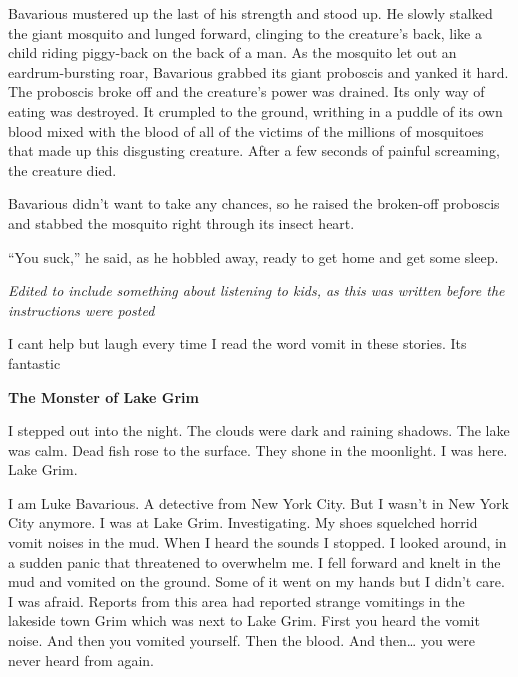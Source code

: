 Bavarious mustered up the last of his strength and stood up. He
slowly stalked the giant mosquito and lunged forward, clinging to
the creature's back, like a child riding piggy-back on the
back of a man. As the mosquito let out an eardrum-bursting roar,
Bavarious grabbed its giant proboscis and yanked it hard. The
proboscis broke off and the creature's power was drained. Its
only way of eating was destroyed. It crumpled to the ground,
writhing in a puddle of its own blood mixed with the blood of all
of the victims of the millions of mosquitoes that made up this
disgusting creature. After a few seconds of painful screaming, the
creature died.



Bavarious didn't want to take any chances, so he raised the
broken-off proboscis and stabbed the mosquito right through its
insect heart.



``You suck,'' he said, as he hobbled away, ready to get
home and get some sleep.





{\em Edited to include something about listening to kids, as this was
written before the instructions were posted} 

 





I cant help but laugh every time I read the word vomit in these
stories. Its fantastic  
 





{\bf The Monster of Lake Grim}



I stepped out into the night. The clouds were dark and raining
shadows. The lake was calm. Dead fish rose to the surface. They
shone in the moonlight. I was here. Lake Grim.



I am Luke Bavarious. A detective from New York City. But I
wasn't in New York City anymore. I was at Lake Grim.
Investigating. My shoes squelched horrid vomit noises in the mud.
When I heard the sounds I stopped. I looked around, in a sudden
panic that threatened to overwhelm me. I fell forward and knelt in
the mud and vomited on the ground. Some of it went on my hands but
I didn't care. I was afraid. Reports from this area had
reported strange vomitings in the lakeside town Grim which was next
to Lake Grim. First you heard the vomit noise. And then you vomited
yourself. Then the blood. And then{\ldots} you were never heard
from again.



